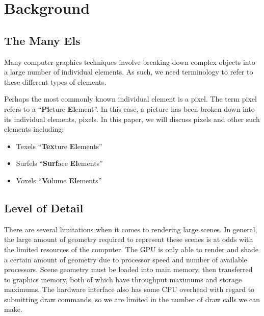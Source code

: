 
\iffalse  \fi

\chapter{Background}





\section{The Many Els}

Many computer graphics techniques involve breaking down complex objects into a large number of individual elements.
As such, we need terminology to refer to these different types of elements.

Perhaps the most commonly known individual element is a pixel.
The term pixel refers to a ``\textbf{Pi}cture \textbf{El}ement''.
In this case, a picture has been broken down into its individual elements, pixels.
In this paper, we will discuss pixels and other such elements including:

\begin{itemize}
	\item Texels ``\textbf{Tex}ture \textbf{El}ements''
	\item Surfels ``\textbf{Surf}ace \textbf{El}ements''
	\item Voxels ``\textbf{Vo}lume \textbf{El}ements''
\end{itemize}


\section{Level of Detail}

There are several limitations when it comes to rendering large scenes.
In general, the large amount of geometry required to represent these scenes is at odds with the limited resources of the computer.
The GPU is only able to render and shade a certain amount of geometry due to processor speed and number of available processors.
Scene geometry must be loaded into main memory, then transferred to graphics memory, both of which have throughput maximums and storage maximums.
The hardware interface also has some CPU overhead with regard to submitting draw commands, so we are limited in the number of draw calls we can make.

